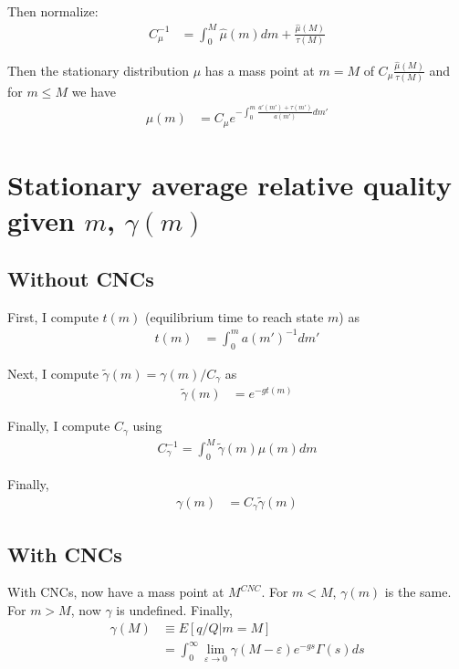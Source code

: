 \documentclass[12pt,english]{article}
\theoremstyle{remark}
\begin{document}
Then normalize:
\begin{align*}
C_{\mu}^{-1} &= \int_0^M \hat{\mu}(m) dm + \frac{\hat{\mu}(M)}{\tau(M)} 
\end{align*}

Then the stationary distribution $\mu$ has a mass point at $m = M$ of $C_{\mu} \frac{\hat{\mu}(M)}{\tau(M)}$ and for $m \le M$ we have 
\begin{align}
\mu(m) &= C_{\mu} e^{-\int_0^m \frac{a'(m') + \tau(m')}{a(m')}dm'}
\end{align}


\section{Stationary average relative quality given $m$, $\gamma(m)$}

\subsection{Without CNCs}

First, I compute $t(m)$ (equilibrium time to reach state $m$) as 
\begin{align*}
t(m) &= \int_0^m a(m')^{-1} dm' 
\end{align*}

Next, I compute $\tilde{\gamma}(m) = \gamma(m) / C_{\gamma}$ as 
\begin{align*}
	\tilde{\gamma}(m) &= e^{-gt(m)}
\end{align*}

Finally, I compute $C_{\gamma}$ using 
\begin{align*}
	C_{\gamma}^{-1} = \int_0^{M} \tilde{\gamma}(m) \mu(m) dm
\end{align*}

Finally, 
\begin{align*}
	\gamma(m) &= C_{\gamma} \tilde{\gamma}(m) 
\end{align*}

\subsection{With CNCs}

With CNCs, now have a mass point at $M^{CNC}$. For $m < M$, $\gamma(m)$ is the same. For $m > M$, now $\gamma$ is undefined. Finally,
\begin{align}
	\gamma(M) &\equiv E[q/Q | m = M] \nonumber \\
	          &= \int_0^{\infty} \lim_{\varepsilon \to 0} \gamma(M-\varepsilon) e^{-gs} \Gamma(s) ds
\end{align} 
\end{document}
